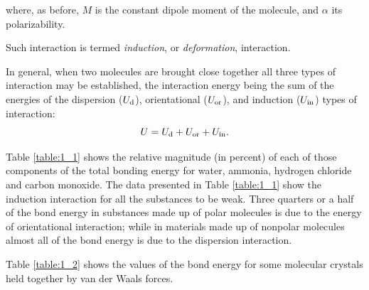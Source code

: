 \noindent
where, as before, $M$ is the constant dipole moment of the molecule, and $\alpha$ its polarizability.

Such interaction is termed \textit{induction}, or \textit{deformation}, interaction.

In general, when two molecules are brought close together all three types of interaction may be established, the interaction energy being the sum of the energies of the dispersion ($U_{\text{d}}$), orientational
($U_{\text{or}}$), and induction ($U_{\text{in}}$) types of interaction:
\begin{equation*}
	U = U_{\text{d}} + U_{\text{or}} + U_{\text{in}}.
\end{equation*}

Table \ref{table:1_1} shows the relative magnitude (in percent) of each of those components of the total bonding energy for water, ammonia, hydrogen chloride and carbon monoxide. The data presented in Table \ref{table:1_1} show the induction interaction for all the substances to be weak. Three quarters or a half of the bond energy in substances made up of polar molecules is due to the energy of orientational interaction; while in materials made up of nonpolar molecules almost all of the bond energy is due to the dispersion interaction.

\begin{table}[!b]
	\renewcommand{\arraystretch}{1.2}
	\caption{}
	\vspace{-0.6cm}
	\label{table:1_1}
	\begin{center}\end{center}
\end{table}

Table \ref{table:1_2} shows the values of the bond energy for some molecular crystals held together by van der Waals forces.

